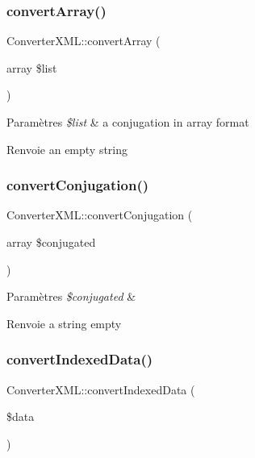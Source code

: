 \subsubsection{\texorpdfstring{convert\+Array()}{convertArray()}}
{\footnotesize\ttfamily Converter\+X\+M\+L\+::convert\+Array (\begin{DoxyParamCaption}\item[{array}]{\$list }\end{DoxyParamCaption})}


\begin{DoxyParams}{Paramètres}
{\em \$list} & a conjugation in array format \\
\hline
\end{DoxyParams}
\begin{DoxyReturn}{Renvoie}
an empty string 
\end{DoxyReturn}
\hypertarget{class_converter_x_m_l_a4c2d281657ce13ceb048b56824fec42a}{}\label{class_converter_x_m_l_a4c2d281657ce13ceb048b56824fec42a} 
\subsubsection{\texorpdfstring{convert\+Conjugation()}{convertConjugation()}}
{\footnotesize\ttfamily Converter\+X\+M\+L\+::convert\+Conjugation (\begin{DoxyParamCaption}\item[{array}]{\$conjugated }\end{DoxyParamCaption})}


\begin{DoxyParams}{Paramètres}
{\em \$conjugated} & \\
\hline
\end{DoxyParams}
\begin{DoxyReturn}{Renvoie}
a string empty 
\end{DoxyReturn}
\hypertarget{class_converter_x_m_l_ab7c370229f1693cea20750b07cc0d1e7}{}\label{class_converter_x_m_l_ab7c370229f1693cea20750b07cc0d1e7} 
\subsubsection{\texorpdfstring{convert\+Indexed\+Data()}{convertIndexedData()}}
{\footnotesize\ttfamily Converter\+X\+M\+L\+::convert\+Indexed\+Data (\begin{DoxyParamCaption}\item[{}]{\$data }\end{DoxyParamCaption})}


